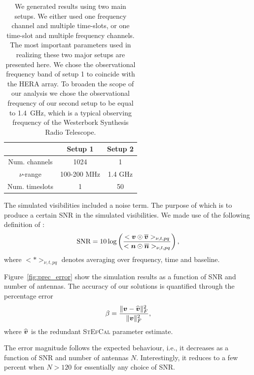 \documentclass[useAMS,usenatbib]{mn2e}
\newcommand{\bz}{\bmath{z}}
\newcommand{\bv}{\bmath{v}}
\newcommand{\bn}{\bmath{n}}
\newcommand{\bone}{\bmath{1}}
\newcommand{\conj}[1]{\overline{#1}}
\begin{document}
\begin{table}
\centering
\caption{We generated results using two main setups. We either used one frequency channel and multiple time-slots, or one time-slot and multiple frequency channels. The most important parameters used in realizing these two major setups are presented here. %
We chose the observational frequency band of setup 1 to coincide with the HERA array. To broaden the scope of our 
analysis we chose the observational frequency of our second setup to be equal to 1.4~GHz, which is a typical observing frequency of the Westerbork Synthesis Radio Telescope.}
\begin{tabular}{|c c c|} 
\hline
 & Setup 1 & Setup 2\\
\hline
\hline
 Num. channels & 1024 & 1\\
$\nu$-range & 100-200 MHz & 1.4 GHz\\
Num. timeslots & 1 & 50\\
\hline
\end{tabular}
\label{tab:ch_parm}
\end{table}

The simulated visibilities included a noise term. The purpose of which is to produce a certain SNR in the simulated
visibilities. We made use of the following definition of \citep[SNR, ][]{Liu2010,Marthi2014}:  
\begin{equation}
\label{}
\textrm{SNR} = 10\log \left (\frac{<\bv\odot\conj{\bv}>_{\nu,t,pq}}{<\bn\odot\conj{\bn}>_{\nu,t,pq}} \right ), 
\end{equation}
where $<*>_{\nu,t,pq}$ denotes averaging over frequency, time and baseline.

Figure~\ref{fig:prec_error} show the simulation results as a function of SNR and number of antennas. The accuracy of our solutions is quantified through the percentage error
\begin{equation}
\label{eq:beta}
\beta = \frac{\|\bv - \widehat{\bv}\|_F^2}{\|\bv\|_F^2},
\end{equation}
where $\widehat{\bv}$ is the redundant \textsc{StEfCal} parameter estimate.

The error magnitude follows the expected behaviour, i.e., it decreases as a function of SNR and number of antennas $N$. Interestingly, it reduces to a few percent when $N > 120$ for essentially any choice of SNR. 
\end{document}
